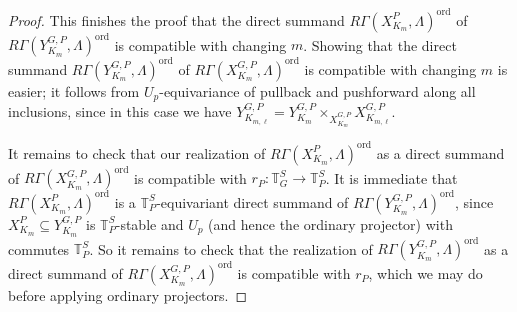 \documentclass{amsart}
\theoremstyle{remark}
\numberwithin{equation}{subsection}
\newcommand{\XGP}[1][m]{X^{G,P}_{K_{#1}}}
\newcommand{\YGP}[1][m]{Y^{G,P}_{K_{#1}}}
\newcommand{\XP}[1][m]{X^{P}_{K_{#1}}}
\DeclareMathOperator{\ord}{ord}
\newcommand{\sub}{\subseteq}
\renewcommand{\(}{\left(}
\renewcommand{\)}{\right)}
\begin{document}
\begin{proof}
\medskip

This finishes the proof that the direct summand $R\Gamma(\XP, \Lambda)^\mathrm{ord}$ of $R\Gamma(\YGP,\Lambda)^\mathrm{ord}$ is compatible with changing $m$. Showing that the direct summand $R\Gamma(\YGP,\Lambda)^\mathrm{ord}$ of $R\Gamma(\XGP,\Lambda)^\mathrm{ord}$ is compatible with changing $m$
is easier; it follows from $U_p$-equivariance of pullback and pushforward along all inclusions, since in this case we have $Y^{G,P}_{K_{m,\ell}} = \YGP \times_{\XGP} X^{G,P}_{K_{m,\ell}}$.

\medskip

It remains to check that our realization of $R\Gamma(\XP,\Lambda)^{\ord}$ as a direct summand of $R\Gamma(\XGP,\Lambda)^\mathrm{ord}$ is compatible with $r_P: \mathbb{T}^S_G \to \mathbb{T}^S_P$. It is immediate that $R\Gamma(\XP,\Lambda)^\mathrm{ord}$
is a $\mathbb{T}^S_P$-equivariant direct summand of $R\Gamma(\YGP,\Lambda)^\mathrm{ord}$, since $\XP \sub \YGP$ is $\mathbb{T}_P^S$-stable and $U_p$ (and hence the ordinary projector) with commutes $\mathbb{T}^S_P$. So it remains to check that the realization of $R\Gamma(\YGP,\Lambda)^\mathrm{ord}$ as a direct summand of $R\Gamma(\XGP,\Lambda)^\mathrm{ord}$ is compatible with $r_P$, which we may do before applying ordinary projectors. 

\medskip


\end{proof}
\end{document}
